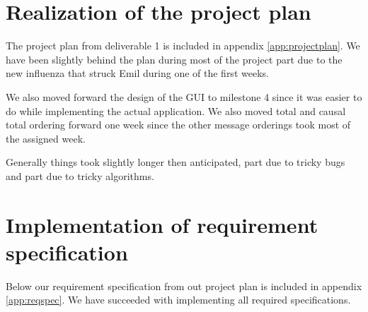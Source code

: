 \documentclass[english]{article}
\begin{document}
\section{Realization of the project plan}
The project plan from deliverable 1 is included in appendix \vref{app:projectplan}. We have been slightly behind the plan during most of the project part due to the new influenza that struck Emil during one of the first weeks.

We also moved forward the design of the GUI to milestone 4 since it was easier to do while implementing the actual application. We also moved total and causal total ordering forward one week since the other message orderings took most of the assigned week. 

Generally things took slightly longer then anticipated, part due to tricky bugs and part due to tricky algorithms. 

\section{Implementation of requirement specification}
Below our requirement specification from out project plan is included in appendix \vref{app:reqspec}. We have succeeded with implementing all required specifications. 

\end{document}

